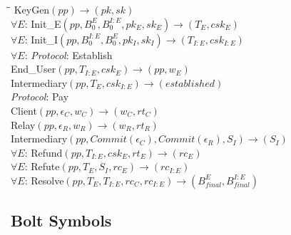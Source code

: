 \documentclass{article}
\begin{document}
\begin{onehalfspacing}
\begin{tabbing}
  \hspace*{1cm}\= \hspace*{1cm}\= \kill
  \> KeyGen$(pp) \rightarrow (pk, sk)$ \\
  $\forall E$: \> Init\_E$(pp, B^E_0, B^{I:E}_0, pk_E, sk_E) \rightarrow (T_E, csk_E)$ \\
  $\forall E$: \> Init\_I$(pp, B^{I:E}_0, B^E_0, pk_I, sk_I) \rightarrow (T_{I:E}, csk_{I:E})$ \\
  $\forall E$: \> \emph{Protocol}: Establish \\
  \> \> End\_User$(pp, T_{I:E}, csk_E) \rightarrow (pp, w_E)$ \\
  \> \> Intermediary$(pp, T_E, csk_{I:E}) \rightarrow (established)$ \\
  \> \emph{Protocol}: Pay \\
  \> \> Client$(pp, \epsilon_C, w_C) \rightarrow (w_C, rt_C)$ \\
  \> \> Relay$(pp, \epsilon_R, w_R) \rightarrow (w_R, rt_R)$ \\
  \> \> Intermediary$(pp, Commit(\epsilon_C), Commit(\epsilon_R), S_I) \rightarrow (S_I)$ \\
  $\forall E$: \> Refund$(pp, T_{I:E}, csk_E, rt_E) \rightarrow (rc_E)$ \\
  $\forall E$: \> Refute$(pp, T_E, S_I, rc_E) \rightarrow (rc_{I:E})$ \\
  $\forall E$: \> Resolve$(pp, T_E, T_{I:E}, rc_C, rc_{I:E}) \rightarrow (B^E_{final}, B^{I:E}_{final})$
\end{tabbing}
\end{onehalfspacing}

\subsection{Bolt Symbols}
\end{document}
